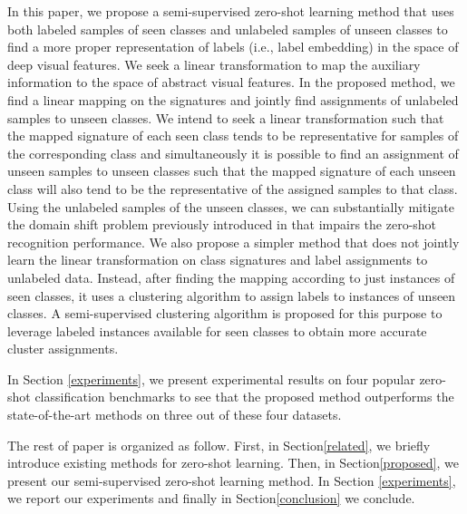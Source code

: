 \documentclass[10pt,twocolumn,letterpaper]{article}
\begin{document}
In this paper, we propose a semi-supervised zero-shot learning method that uses both labeled samples of seen classes and unlabeled samples of unseen classes to find a more proper representation of labels (i.e., label embedding) in the space of deep visual features. We seek a linear transformation to map the auxiliary information to the space of abstract visual features. In the proposed method,
we find a linear mapping on the signatures and jointly find assignments of unlabeled samples to unseen classes.
We intend to seek a linear transformation such that the mapped signature of each seen class tends to be representative for samples of the corresponding class and simultaneously it is possible to find an assignment of unseen samples to unseen classes such that the mapped signature of  each unseen class will also tend to be the representative of the assigned samples to that class.
Using the unlabeled samples of the unseen classes, we can substantially mitigate the domain shift problem previously introduced in \cite{eccv14} that impairs the zero-shot recognition performance.
We also propose a simpler method that does not jointly learn the linear transformation on class signatures and label assignments to unlabeled data.
Instead, after finding the mapping according to just instances of seen classes, it uses a clustering algorithm to assign labels to instances of unseen classes. A semi-supervised clustering algorithm is proposed for this purpose to leverage labeled instances available for seen classes to obtain more accurate cluster assignments.

In Section \ref{experiments}, we present experimental results on four popular zero-shot classification benchmarks to see that the proposed method outperforms the state-of-the-art methods on three out of these four datasets.

The rest of paper is organized as follow. First, in Section\ref{related}, we briefly introduce existing methods for zero-shot learning.
Then, in Section\ref{proposed}, we present our semi-supervised zero-shot learning method. In Section \ref{experiments}, we report our experiments and finally in Section\ref{conclusion}
we conclude.
\end{document}
